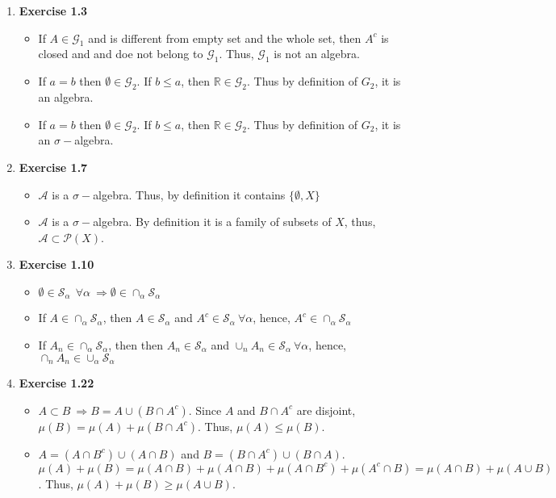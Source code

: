 \documentclass[10pt, letterpaper,bibtotoc, tablecaptionabove, figurecaptionabove]{article}
\begin{document}
\begin{enumerate}
\item {\bf{Exercise 1.3}}
\begin{itemize}
\item If $A\in\mathcal G_1$ and is different from empty set and the whole set, then $A^c$ is closed and and doe not belong to $\mathcal G_1$. Thus, $\mathcal G_1$ is not an algebra.  
\item If $a=b$ then $\emptyset\in \mathcal G_2$. If $b\leq a$, then $\mathbb R\in \mathcal G_2$. Thus by definition of $G_2$, it is an algebra.
\item If $a=b$ then $\emptyset\in \mathcal G_2$. If $b\leq a$, then $\mathbb R\in \mathcal G_2$. Thus by definition of $G_2$, it  is an $\sigma-$algebra.
\end{itemize}
\item{\bf{Exercise 1.7}}
\begin{itemize}
\item  $\mathcal A$ is a $\sigma-$algebra. Thus, by definition it contains $\{\emptyset,X\}$
\item  $\mathcal A$ is a $\sigma-$algebra. By definition it is a family of subsets of $X$, thus, $\mathcal A\subset \mathcal P(X)$.
\end{itemize}
\item{\bf{Exercise 1.10}}
\begin{itemize}
\item $\emptyset\in \mathcal S_\alpha \ \ \forall \alpha \ \Rightarrow \emptyset \in \cap_\alpha \mathcal S_\alpha$
\item If $A\in \cap_\alpha \mathcal S_\alpha$, then $A\in \mathcal S_\alpha $ and $A^c\in \mathcal S_\alpha \ \forall \alpha$, hence, $A^c\in \cap_\alpha \mathcal S_\alpha$
\item If $A_n\in\cap_\alpha\mathcal S_\alpha$, then  then $A_n\in \mathcal S_\alpha $ and $\cup_n A_n\in \mathcal S_\alpha \ \forall \alpha$, hence,  $\cap_n A_n \in \cup_\alpha \mathcal S_\alpha$
\end{itemize}
\item{\bf{Exercise 1.22}}
\begin{itemize}
\item  $A\subset B \ \Rightarrow B=A\cup (B\cap A^c)$. Since $A$ and $B\cap A^c$ are disjoint, $\mu(B)=\mu(A)+\mu(B\cap A^c)$. Thus, $\mu(A)\leq\mu(B)$.
\item  $A=(A\cap B^c)\cup (A\cap B)$ and $B=(B\cap A^c)\cup(B\cap A)$. $\mu(A)+\mu(B)=\mu(A\cap B)+\mu(A\cap B)+\mu(A\cap B^c)+\mu(A^c\cap B)=\mu(A\cap B)+\mu(A\cup B)$. Thus, $\mu(A)+\mu(B)\geq \mu(A\cup B)$. 

\end{itemize}
\end{enumerate}
\end{document}
